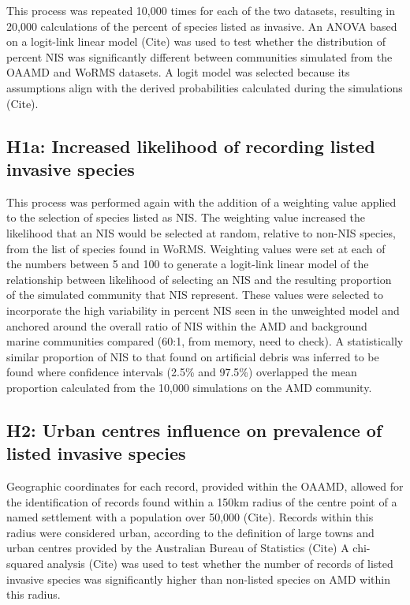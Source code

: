 \documentclass[a4paper, nobind]{templates/ociamthesis}
\begin{document}
This process was repeated 10,000 times for each of the two datasets, resulting in 20,000 calculations of the percent of species listed as invasive. An ANOVA based on a logit-link linear model (Cite) was used to test whether the distribution of percent NIS was significantly different between communities simulated from the OAAMD and WoRMS datasets. A logit model was selected because its assumptions align with the derived probabilities calculated during the simulations (Cite).

\hypertarget{h1a-increased-likelihood-of-recording-listed-invasive-species}{%
\subsection{H1a: Increased likelihood of recording listed invasive species}\label{h1a-increased-likelihood-of-recording-listed-invasive-species}}

This process was performed again with the addition of a weighting value applied to the selection of species listed as NIS. The weighting value increased the likelihood that an NIS would be selected at random, relative to non-NIS species, from the list of species found in WoRMS. Weighting values were set at each of the numbers between 5 and 100 to generate a logit-link linear model of the relationship between likelihood of selecting an NIS and the resulting proportion of the simulated community that NIS represent. These values were selected to incorporate the high variability in percent NIS seen in the unweighted model and anchored around the overall ratio of NIS within the AMD and background marine communities compared (60:1, from memory, need to check). A statistically similar proportion of NIS to that found on artificial debris was inferred to be found where confidence intervals (2.5\% and 97.5\%) overlapped the mean proportion calculated from the 10,000 simulations on the AMD community.

\hypertarget{h2-urban-centres-influence-on-prevalence-of-listed-invasive-species}{%
\subsection{H2: Urban centres influence on prevalence of listed invasive species}\label{h2-urban-centres-influence-on-prevalence-of-listed-invasive-species}}

Geographic coordinates for each record, provided within the OAAMD, allowed for the identification of records found within a 150km radius of the centre point of a named settlement with a population over 50,000 (Cite). Records within this radius were considered urban, according to the definition of large towns and urban centres provided by the Australian Bureau of Statistics (Cite) A chi-squared analysis (Cite) was used to test whether the number of records of listed invasive species was significantly higher than non-listed species on AMD within this radius.
\end{document}
